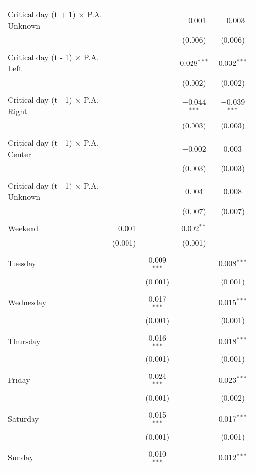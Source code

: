 \documentclass[
]{article}
\begin{document}
\begin{table}[!htbp]
{\begin{tabular}{@{\extracolsep{5pt}}lcccc}
  & & & & \\ 
 Critical day (t + 1) $\times$ P.A. Unknown &  &  & $-$0.001 & $-$0.003 \\ 
  &  &  & (0.006) & (0.006) \\ 
  & & & & \\ 
 Critical day (t - 1) $\times$ P.A. Left &  &  & 0.028$^{***}$ & 0.032$^{***}$ \\ 
  &  &  & (0.002) & (0.002) \\ 
  & & & & \\ 
 Critical day (t - 1) $\times$ P.A. Right &  &  & $-$0.044$^{***}$ & $-$0.039$^{***}$ \\ 
  &  &  & (0.003) & (0.003) \\ 
  & & & & \\ 
 Critical day (t - 1) $\times$ P.A. Center &  &  & $-$0.002 & 0.003 \\ 
  &  &  & (0.003) & (0.003) \\ 
  & & & & \\ 
 Critical day (t - 1) $\times$ P.A. Unknown &  &  & 0.004 & 0.008 \\ 
  &  &  & (0.007) & (0.007) \\ 
  & & & & \\ 
 Weekend & $-$0.001 &  & 0.002$^{**}$ &  \\ 
  & (0.001) &  & (0.001) &  \\ 
  & & & & \\ 
 Tuesday &  & 0.009$^{***}$ &  & 0.008$^{***}$ \\ 
  &  & (0.001) &  & (0.001) \\ 
  & & & & \\ 
 Wednesday &  & 0.017$^{***}$ &  & 0.015$^{***}$ \\ 
  &  & (0.001) &  & (0.001) \\ 
  & & & & \\ 
 Thursday &  & 0.016$^{***}$ &  & 0.018$^{***}$ \\ 
  &  & (0.001) &  & (0.001) \\ 
  & & & & \\ 
 Friday &  & 0.024$^{***}$ &  & 0.023$^{***}$ \\ 
  &  & (0.001) &  & (0.002) \\ 
  & & & & \\ 
 Saturday &  & 0.015$^{***}$ &  & 0.017$^{***}$ \\ 
  &  & (0.001) &  & (0.001) \\ 
  & & & & \\ 
 Sunday &  & 0.010$^{***}$ &  & 0.012$^{***}$ \\ 

\end{tabular}}
\end{table}
\end{document}
